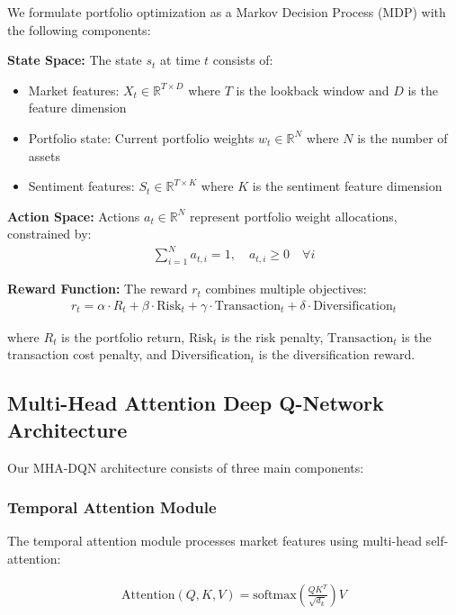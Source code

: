 \documentclass[11pt]{article}
\begin{document}
We formulate portfolio optimization as a Markov Decision Process (MDP) with the following components:

\textbf{State Space:} The state $s_t$ at time $t$ consists of:
\begin{itemize}
    \item Market features: $X_t \in \mathbb{R}^{T \times D}$ where $T$ is the lookback window and $D$ is the feature dimension
    \item Portfolio state: Current portfolio weights $w_t \in \mathbb{R}^N$ where $N$ is the number of assets
    \item Sentiment features: $S_t \in \mathbb{R}^{T \times K}$ where $K$ is the sentiment feature dimension
\end{itemize}

\textbf{Action Space:} Actions $a_t \in \mathbb{R}^N$ represent portfolio weight allocations, constrained by:
\begin{align}
    \sum_{i=1}^N a_{t,i} = 1, \quad a_{t,i} \geq 0 \quad \forall i
\end{align}

\textbf{Reward Function:} The reward $r_t$ combines multiple objectives:
\begin{align}
    r_t = \alpha \cdot R_t + \beta \cdot \text{Risk}_t + \gamma \cdot \text{Transaction}_t + \delta \cdot \text{Diversification}_t
\end{align}

where $R_t$ is the portfolio return, $\text{Risk}_t$ is the risk penalty, $\text{Transaction}_t$ is the transaction cost penalty, and $\text{Diversification}_t$ is the diversification reward.

\subsection{Multi-Head Attention Deep Q-Network Architecture}

Our MHA-DQN architecture consists of three main components:

\subsubsection{Temporal Attention Module}

The temporal attention module processes market features using multi-head self-attention:

\begin{align}
    \text{Attention}(Q, K, V) = \text{softmax}\left(\frac{QK^T}{\sqrt{d_k}}\right)V
\end{align}
\end{document}
